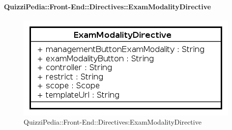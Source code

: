 \paragraph{QuizziPedia::Front-End::Directives::ExamModalityDirective}
\begin{figure} [ht]
	\centering
	\includegraphics[scale=0.80]{UML/Classi/Front-End/QuizziPedia_Front-end_ExamModalityDirective.png}
	\caption{QuizziPedia::Front-End::Directives:ExamModalityDirective}
\end{figure} \FloatBarrier
